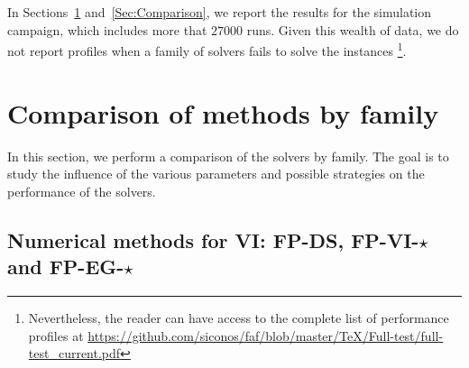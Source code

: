 In Sections~\ref{Sec:ComparisonFamily} and~\ref{Sec:Comparison}, we report the results for the simulation campaign, which includes more that $27000$ runs.
{Given this wealth of data, we do not report profiles when a family of solvers fails to solve the instances}
\footnote{Nevertheless, the reader can have access to the complete list of performance profiles at \href{https://github.com/siconos/faf/blob/master/TeX/Full-test/full-test_current.pdf}{https://github.com/siconos/faf/blob/master/TeX/Full-test/full-test\_current.pdf}}.
\newcommand\commentedfigure[1]{}
\makeatletter
\def\subfigcounter{\thesubfigure}
\makeatother
\def\subfiglayout{%
  \captionsetup[subfloat]{farskip=-0pt,captionskip=-2pt,font=scriptsize}%
  \setlength{\abovecaptionskip}{0pt}}
\def\measurename{time}
\def\performance{time}
\def\widthfigure{0.6}
\def\figwidth{0.50\textwidth}
\def\legendwidth{0.6\textwidth}
\def\legendheight{0.15\textheight}

\section{Comparison of methods by family}
\label{Sec:ComparisonFamily}
In this section, we perform a comparison of the solvers by family. The goal is  to study the influence of the various parameters and possible strategies on the performance of the solvers.

\subsection{Numerical methods for VI: {\sf FP-DS, FP-VI-$\star$} and {\sf FP-EG-$\star$}}
\label{Sec:Comparison,VI,step-length}


